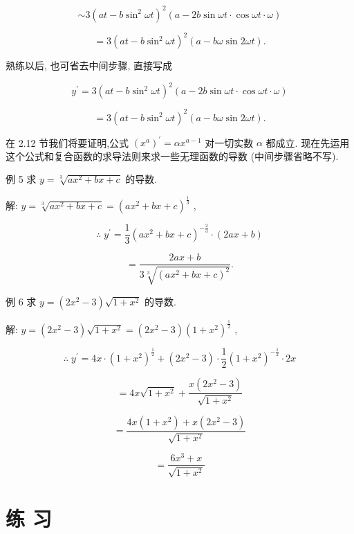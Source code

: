 \documentclass[10pt]{article}
\begin{document}
\[
\sim 3{\left( at - b{\sin }^{2}\omega t\right) }^{2}\left( {a - {2b}\sin {\omega t} \cdot \cos {\omega t} \cdot \omega }\right)
\]

\[
= 3{\left( at - b{\sin }^{2}\omega t\right) }^{2}\left( {a - {b\omega }\sin {2\omega t}}\right) \text{.}
\]

熟练以后, 也可省去中间步骤, 直接写成

\[
{y}^{\prime } = 3{\left( at - b{\sin }^{2}\omega t\right) }^{2}\left( {a - {2b}\sin {\omega t} \cdot \cos {\omega t} \cdot \omega }\right)
\]

\[
= 3{\left( at - b{\sin }^{2}\omega t\right) }^{2}\left( {a - {b\omega }\sin {2\omega t}}\right) \text{.}
\]

在 2.12 节我们将要证明,公式 \({\left( {x}^{a}\right) }^{\prime } = \alpha {x}^{a - 1}\) 对一切实数 \(\alpha\) 都成立. 现在先运用这个公式和复合函数的求导法则来求一些无理函数的导数 (中间步骤省略不写).

例 5 求 \(y = \sqrt[3]{a{x}^{2} + {bx} + c}\) 的导数.

解: \(y = \sqrt[3]{a{x}^{2} + {bx} + c} = {\left( a{x}^{2} + bx + c\right) }^{\frac{1}{3}}\) ,

\[
\therefore \;{y}^{\prime } = \frac{1}{3}{\left( a{x}^{2} + bx + c\right) }^{-\frac{2}{3}} \cdot \left( {{2ax} + b}\right)
\]

\[
= \frac{{2ax} + b}{3\sqrt[3]{{\left( a{x}^{2} + bx + c\right) }^{2}}}.
\]

例 6 求 \(y = \left( {2{x}^{2} - 3}\right) \sqrt{1 + {x}^{2}}\) 的导数.

解: \(y = \left( {2{x}^{2} - 3}\right) \sqrt{1 + {x}^{2}} = \left( {2{x}^{2} - 3}\right) {\left( 1 + {x}^{2}\right) }^{\frac{1}{2}}\) ,

\[
\therefore \;{y}^{\prime } = {4x} \cdot {\left( 1 + {x}^{2}\right) }^{\frac{1}{2}} + \left( {2{x}^{2} - 3}\right) \cdot \frac{1}{2}{\left( 1 + {x}^{2}\right) }^{-\frac{1}{2}} \cdot {2x}
\]

\[
= {4x}\sqrt{1 + {x}^{2}} + \frac{x\left( {2{x}^{2} - 3}\right) }{\sqrt{1 + {x}^{2}}}
\]

\[
= \frac{{4x}\left( {1 + {x}^{2}}\right) + x\left( {2{x}^{2} - 3}\right) }{\sqrt{1 + {x}^{2}}}
\]

\[
= \frac{6{x}^{3} + x}{\sqrt{1 + {x}^{2}}}
\]

\section*{练 习}
\end{document}

